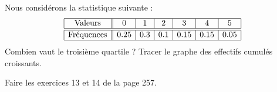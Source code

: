 
\begin{exercice}\label{exosmath-0534}

    Nous considérons la statistique suivante :
    \begin{equation*}
        \begin{array}[]{|c||c|c|c|c|c|c|}
            \hline
            \text{Valeurs}&0&1&2&3&4&5\\
            \hline\hline
            \text{Fréquences}&0.25&0.3&0.1&0.15&0.15&0.05\\
            \hline
        \end{array}
    \end{equation*}
    Combien vaut le troisième quartile ? Tracer le graphe des effectifs cumulés croissants.

    Faire les exercices 13 et 14 de la page 257.

\end{exercice}
